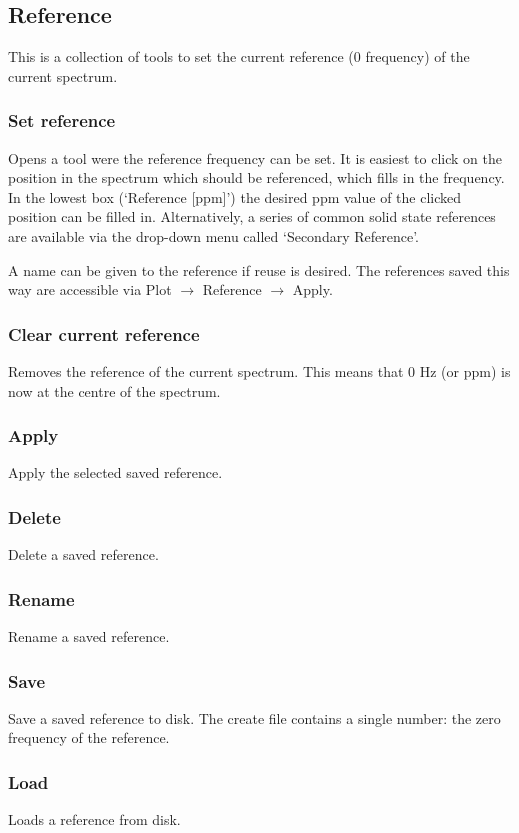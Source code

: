 \documentclass[11pt,a4paper]{article}
\begin{document}
\subsection{Reference}
This is a collection of tools to set the current reference (0 frequency) of the current spectrum.

\subsubsection{Set reference}
Opens a tool were the reference frequency can be set. It is easiest to click on the position in the spectrum
which should be referenced, which fills in the frequency. In the lowest box (`Reference [ppm]') the desired
ppm value of the clicked position can be filled in. Alternatively, a series of common solid state references
are available via the drop-down menu called `Secondary Reference'.

A name can be given to the reference if reuse is desired. The references saved this way are accessible via Plot
$\rightarrow$ Reference $\rightarrow$ Apply.


\subsubsection{Clear current reference}
Removes the reference of the current spectrum. This means that 0 Hz (or ppm) is now at the centre of the
spectrum.

\subsubsection{Apply}
Apply the selected saved reference.

\subsubsection{Delete}
Delete a saved reference.

\subsubsection{Rename}
Rename a saved reference.

\subsubsection{Save}
Save a saved reference to disk. The create file contains a single number: the zero frequency of the reference.

\subsubsection{Load}
Loads a reference from disk.
\end{document}
